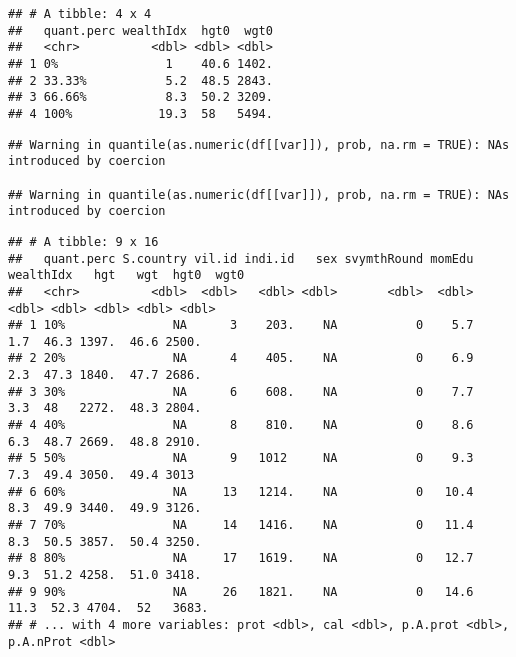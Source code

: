 \documentclass[
]{book}
\newenvironment{Shaded}{\begin{snugshade}}{\end{snugshade}}
\newcommand{\CommentTok}[1]{\textcolor[rgb]{0.56,0.35,0.01}{\textit{#1}}}
\newcommand{\DataTypeTok}[1]{\textcolor[rgb]{0.13,0.29,0.53}{#1}}
\newcommand{\FloatTok}[1]{\textcolor[rgb]{0.00,0.00,0.81}{#1}}
\newcommand{\KeywordTok}[1]{\textcolor[rgb]{0.13,0.29,0.53}{\textbf{#1}}}
\newcommand{\NormalTok}[1]{#1}
\newcommand{\OperatorTok}[1]{\textcolor[rgb]{0.81,0.36,0.00}{\textbf{#1}}}
\newcommand{\StringTok}[1]{\textcolor[rgb]{0.31,0.60,0.02}{#1}}
\begin{document}
\begin{verbatim}
## # A tibble: 4 x 4
##   quant.perc wealthIdx  hgt0  wgt0
##   <chr>          <dbl> <dbl> <dbl>
## 1 0%               1    40.6 1402.
## 2 33.33%           5.2  48.5 2843.
## 3 66.66%           8.3  50.2 3209.
## 4 100%            19.3  58   5494.
\end{verbatim}

\begin{Shaded}
\end{Shaded}

\begin{verbatim}
## Warning in quantile(as.numeric(df[[var]]), prob, na.rm = TRUE): NAs introduced by coercion

## Warning in quantile(as.numeric(df[[var]]), prob, na.rm = TRUE): NAs introduced by coercion
\end{verbatim}

\begin{verbatim}
## # A tibble: 9 x 16
##   quant.perc S.country vil.id indi.id   sex svymthRound momEdu wealthIdx   hgt   wgt  hgt0  wgt0
##   <chr>          <dbl>  <dbl>   <dbl> <dbl>       <dbl>  <dbl>     <dbl> <dbl> <dbl> <dbl> <dbl>
## 1 10%               NA      3    203.    NA           0    5.7       1.7  46.3 1397.  46.6 2500.
## 2 20%               NA      4    405.    NA           0    6.9       2.3  47.3 1840.  47.7 2686.
## 3 30%               NA      6    608.    NA           0    7.7       3.3  48   2272.  48.3 2804.
## 4 40%               NA      8    810.    NA           0    8.6       6.3  48.7 2669.  48.8 2910.
## 5 50%               NA      9   1012     NA           0    9.3       7.3  49.4 3050.  49.4 3013 
## 6 60%               NA     13   1214.    NA           0   10.4       8.3  49.9 3440.  49.9 3126.
## 7 70%               NA     14   1416.    NA           0   11.4       8.3  50.5 3857.  50.4 3250.
## 8 80%               NA     17   1619.    NA           0   12.7       9.3  51.2 4258.  51.0 3418.
## 9 90%               NA     26   1821.    NA           0   14.6      11.3  52.3 4704.  52   3683.
## # ... with 4 more variables: prot <dbl>, cal <dbl>, p.A.prot <dbl>, p.A.nProt <dbl>
\end{verbatim}
\end{document}
